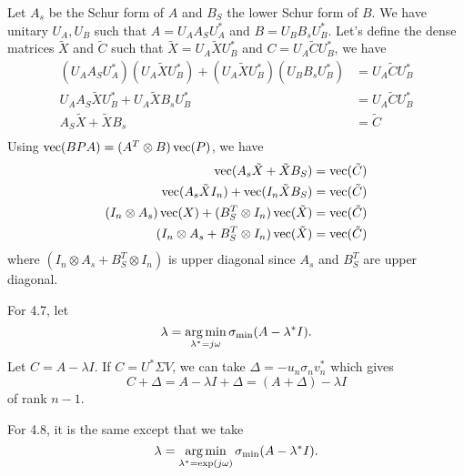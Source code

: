 \begin{solution}
  Let $A_s$ be the Schur form of $A$ and $B_S$ the lower Schur
  form of $B$.
  We have unitary $U_A, U_B$ such that
  $A = U_AA_SU_A^*$ and $B = U_BB_sU_B^*$.
  Let's define the dense matrices $\tilde{X}$ and $\tilde{C}$ such that
  $\tilde{X} = U_A\tilde{X}U_B^*$ and $C = U_A\tilde{C}U_B^*$, we have
  \begin{align*}
    (U_AA_SU_A^*)(U_A\tilde{X}U_B^*) + (U_A\tilde{X}U_B^*)(U_BB_sU_B^*)
    & = U_A\tilde{C}U_B^*\\
    U_AA_S\tilde{X}U_B^* + U_A\tilde{X}B_sU_B^* & = U_A\tilde{C}U_B^*\\
    A_S\tilde{X} + \tilde{X}B_s & = \tilde{C}\\
  \end{align*}
  Using $\operatorname{vec}(BPA) = (A^T \otimes B) \operatorname{vec}(P)$, we have
  \begin{align*}
    \operatorname{vec}(A_s\tilde{X} + \tilde{X}B_S) & = \operatorname{vec}(\tilde{C})\\
    \operatorname{vec}(A_s\tilde{X}I_n) + \operatorname{vec}(I_n\tilde{X}B_S) & = \operatorname{vec}(\tilde{C})\\
    (I_n \otimes A_s) \operatorname{vec}(X) + (B_S^T \otimes I_n) \operatorname{vec}(\tilde{X}) & = \operatorname{vec}(\tilde{C})\\
    (I_n \otimes A_s + B_S^T \otimes I_n) \operatorname{vec}(\tilde{X}) & = \operatorname{vec}(\tilde{C})
  \end{align*}
  where $(I_n \otimes A_s + B_S^T \otimes I_n)$ is upper diagonal
  since $A_s$ and $B_S^T$ are upper diagonal.
\end{solution}

\begin{solution}
  For 4.7, let
  \[ \lambda = \operatorname*{arg\,min}_{\lambda^* = j\omega} \sigma_{\mathrm{min}}(A - \lambda^*I). \]
  Let $C = A - \lambda I$.
  If $C = U^* \Sigma V$, we can take $\Delta = -u_n \sigma_n v_n^*$ which gives
  \[ C + \Delta = A - \lambda I + \Delta = (A + \Delta) - \lambda I \]
  of rank $n-1$.

  For 4.8, it is the same except that we take
  \[ \lambda = \operatorname*{arg\,min}_{\lambda^* = \exp(j\omega)} \sigma_{\mathrm{min}}(A - \lambda^*I). \]
\end{solution}

\nosolution
